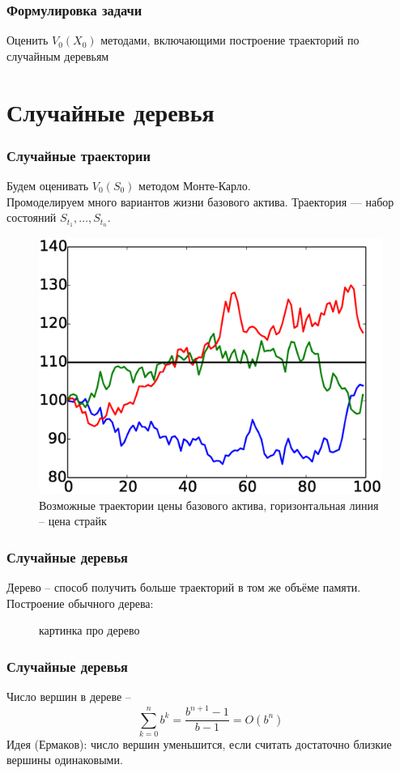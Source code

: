 \documentclass[unicode, notheorems]{beamer}
\begin{document}
  \begin{frame}
    \frametitle{Формулировка задачи}
    Оценить $V_0(X_0)$ методами, включающими построение траекторий по случайным деревьям
  \end{frame}

\section{Случайные деревья}
    \begin{frame}
        \frametitle{Случайные траектории}
        Будем оценивать $V_0(S_0)$ методом Монте-Карло.
        \\ Промоделируем много вариантов жизни базового актива. Траектория --- набор состояний $S_{t_1}, \ldots, S_{t_n}$.
        \begin{figure}[h]
            \includegraphics[height=0.5\paperheight]{traces}
            \caption{Возможные траектории цены базового актива, горизонтальная линия -- цена страйк}
            \label{fig:traces}
        \end{figure}
    \end{frame}

\begin{frame}
    \frametitle{Случайные деревья}
    Дерево -- способ получить больше траекторий в том же объёме памяти. Построение обычного дерева:
    \begin{figure}[h]
        картинка про дерево
    \end{figure}
\end{frame}

\begin{frame}
    \frametitle{Случайные деревья}
    Число вершин в дереве -- $$\sum_{k=0}^n b^k = \frac{b^{n+1} - 1}{b-1} = O(b^n)$$
    Идея (Ермаков): число вершин уменьшится, если считать достаточно близкие вершины одинаковыми.
\end{frame}
\end{document}
